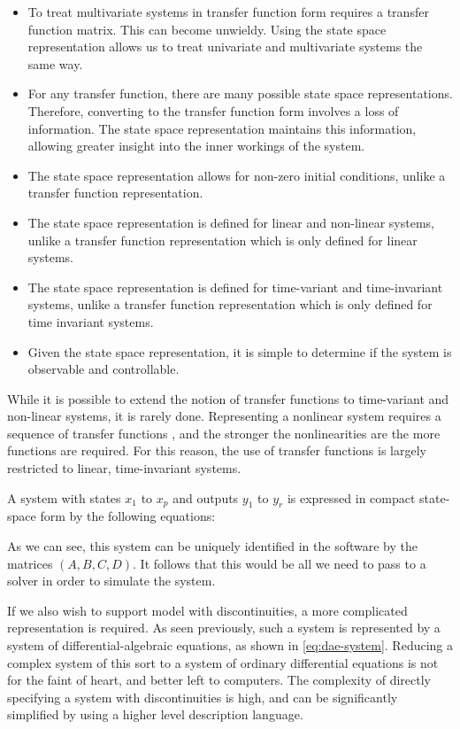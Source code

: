 \documentclass[\rootfolder/main.tex]{subfiles}
\begin{document}
\begin{itemize}
	\item To treat multivariate systems in transfer function form requires a transfer function matrix. This can become unwieldy.
		Using the state space representation allows us to treat univariate and multivariate systems the same way.
	\item For any transfer function, there are many possible state space representations. Therefore, converting to the transfer function form involves a loss of information.
		The state space representation maintains this information, allowing greater insight into the inner workings of the system.
	\item The state space representation allows for non-zero initial conditions, unlike a transfer function representation.
	\item The state space representation is defined for linear and non-linear systems, unlike a transfer function representation which is only defined for linear systems.
	\item The state space representation is defined for time-variant and time-invariant systems, unlike a transfer function representation which is only defined for time invariant systems.
	\item Given the state space representation, it is simple to determine if the system is observable and controllable.
\end{itemize}

While it is possible to extend the notion of transfer functions to time-variant and non-linear systems, it is rarely done.
Representing a nonlinear system requires a sequence of transfer functions \cite{Zhang1993}, and the stronger the nonlinearities are the more functions are required.
For this reason, the use of transfer functions is largely restricted to linear, time-invariant systems.

A system with states $x_{1}$ to $x_{p}$ and outputs $y_{1}$ to $y_{r}$ is expressed in compact state-space form by the following equations:

As we can see, this system can be uniquely identified in the software by the matrices $(A, B, C, D)$. 
It follows that this would be all we need to pass to a solver in order to simulate the system.

If we also wish to support model with discontinuities, a more complicated representation is required.
As seen previously, such a system is represented by a system of differential-algebraic equations, as shown in \cref{eq:dae-system}.
Reducing a complex system of this sort to a system of ordinary differential equations is not for the faint of heart, and better left to computers.
The complexity of directly specifying a system with discontinuities is high, and can be significantly simplified by using a higher level description language.
\end{document}
